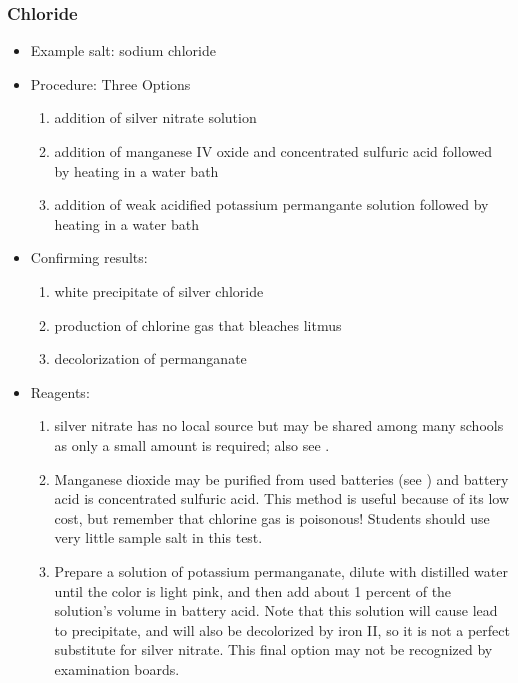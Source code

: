 \subsubsection{Chloride}
\begin{itemize}
\item{Example salt: sodium chloride}
\item{Procedure: Three Options
\begin{enumerate}
\item{addition of silver nitrate solution}
\item{addition of manganese IV oxide and concentrated sulfuric acid 
followed by heating in a water bath}
\item{addition of weak acidified potassium permangante solution 
followed by heating in a water bath}
\end{enumerate}
} %
\item{Confirming results:
\begin{enumerate}
\item{white precipitate of silver chloride} 
\item{production of chlorine gas that bleaches litmus} 
\item{decolorization of permanganate}
\end{enumerate}
} %
\item{Reagents:
\begin{enumerate}
\item{silver nitrate has no local source 
but may be shared among many schools as only a small amount is required; 
also see .}
\item{Manganese dioxide may be purified from used batteries 
(see ) and battery acid is concentrated sulfuric acid. 
This method is useful because of its low cost, 
but remember that chlorine gas is poisonous! 
Students should use very little sample salt in this test.}
\item{Prepare a solution of potassium permanganate, 
dilute with distilled water until the color is light pink, 
and then add about 1 percent of the solution's volume in battery acid. 
Note that this solution will cause lead to precipitate, 
and will also be decolorized by iron II, 
so it is not a perfect substitute for silver nitrate. 
This final option may not be recognized by examination boards.}
\end{enumerate}
} %
\end{itemize}


